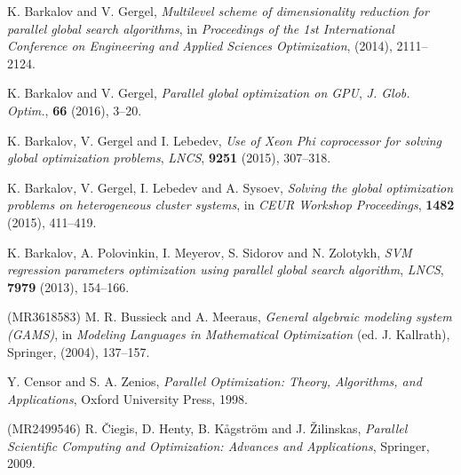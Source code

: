 \documentclass[runningheads]{llncs}
\begin{document}
%
%
% 
% 
%
\begin{thebibliography}{107}

\newblock K. Barkalov and V. Gergel,
\newblock \emph{\emph{Multilevel scheme of dimensionality reduction for parallel global search algorithms}},
\newblock in \emph{Proceedings of the 1st International Conference on Engineering and Applied Sciences Optimization}, (2014), 2111--2124.

\newblock K. Barkalov and V. Gergel,
\newblock \emph{\emph{Parallel global optimization on GPU}},
\newblock \emph{J. Glob. Optim.}, \textbf{66} (2016), 3--20.

\newblock K. Barkalov, V. Gergel and I. Lebedev,
\newblock \emph{\emph{Use of Xeon Phi coprocessor for solving global optimization problems}},
\newblock \emph{LNCS}, \textbf{9251} (2015), 307--318.

\newblock K. Barkalov, V. Gergel, I. Lebedev and A. Sysoev,
\newblock \emph{\emph{Solving the global optimization problems on heterogeneous cluster systems}},
\newblock in \emph{CEUR Workshop Proceedings}, \textbf{1482} (2015), 411--419.

\newblock K. Barkalov, A. Polovinkin, I. Meyerov, S. Sidorov and N. Zolotykh,
\newblock \emph{\emph{SVM regression parameters optimization using parallel global search algorithm}},
\newblock \emph{LNCS}, \textbf{7979} (2013), 154--166.

 (MR3618583)%
\newblock M. R. Bussieck and A. Meeraus,
\newblock \emph{\emph{General algebraic modeling system (GAMS)}},
\newblock in \emph{Modeling Languages in Mathematical Optimization} (ed. J. Kallrath), Springer, (2004), 137--157.

\newblock Y. Censor and S. A. Zenios,
\newblock \emph{Parallel Optimization: Theory, Algorithms, and Applications},
\newblock Oxford University Press, 1998.

 (MR2499546)%
\newblock R. \v Ciegis, D. Henty, B. K\aa gstr\"om and J. \v Zilinskas,
\newblock \emph{Parallel Scientific Computing and Optimization: Advances and Applications},
\newblock Springer, 2009.


\end{thebibliography}
\end{document}
